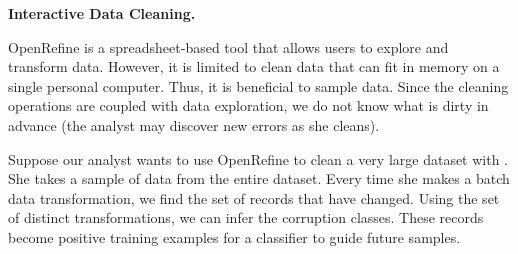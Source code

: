 \noindent\textbf{Interactive Data Cleaning.}
\begin{example}
OpenRefine is a spreadsheet-based tool that allows users to explore and transform data.
However, it is limited to clean data that can fit in memory on a single personal computer.
Thus, it is beneficial to sample data.
Since the cleaning operations are coupled with data exploration, we do not know what is dirty in advance (the analyst may discover new errors as she cleans).

Suppose our analyst wants to use OpenRefine to clean a very large dataset with \sys.
She takes a sample of data from the entire dataset.
Every time she makes a batch data transformation, we find the set of records that have changed.
Using the set of distinct transformations, we can infer the corruption classes. 
These records become positive training examples for a classifier to guide future samples.
\end{example}